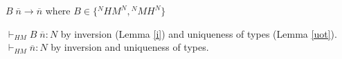 \begin{case}
$B\;\overline{n}\rightarrow\overline{n}$ where $B\in\lbrace{^{N}HM^{N}},{^{N}MH^{N}}\rbrace$

$\vdash_{HM}B\;\overline{n}:N$ by inversion (Lemma \ref{i}) and uniqueness of types (Lemma \ref{uot}).  $\vdash_{HM}\overline{n}:N$ by inversion and uniqueness of types.
\end{case}